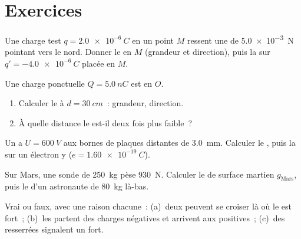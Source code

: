 \section{Exercices}

\begin{exercise}[$\star$]\label{exo:g11:electric-gravitational-fields:1}
Une charge test $q = \qty{+2.0e-6}{C}$ en un point $M$ ressent une
 de \qty{5.0e-3}{N} pointant vers le nord.
Donner le  en $M$ (grandeur et
direction), puis la  sur
$q' = \qty{-4.0e-6}{C}$ placée en $M$.
\end{exercise}

\begin{exercise}[$\star$]\label{exo:g11:electric-gravitational-fields:2}
Une charge ponctuelle $Q = \qty{+5.0}{nC}$ est en $O$.
\begin{enumerate}
  \item Calculer le  à
        $d = \qty{30}{cm}$~: grandeur, direction.
  \item À quelle distance le
         est-il deux fois plus
        faible~?
\end{enumerate}
\end{exercise}

\begin{exercise}[$\star$]\label{exo:g11:electric-gravitational-fields:3}
Un  a $U = \qty{600}{V}$
aux bornes de plaques distantes de \qty{3.0}{mm}. Calculer le
, puis la
 sur un électron y
($e = \qty{1.60e-19}{C}$).
\end{exercise}

\begin{exercise}[$\star$]\label{exo:g11:electric-gravitational-fields:4}
Sur Mars, une sonde de \qty{250}{kg} pèse \qty{930}{N}. Calculer le
 de surface martien
$g_{\text{Mars}}$, puis le  d'un
astronaute de \qty{80}{kg} là-bas.
\end{exercise}

\begin{exercise}[$\star$]\label{exo:g11:electric-gravitational-fields:5}
Vrai ou faux, avec une raison chacune~: (a)~deux
 peuvent se croiser là
où le  est fort~; (b)~les
 partent des charges
négatives et arrivent aux positives~; (c)~des
 resserrées
signalent un
 fort.
\end{exercise}

